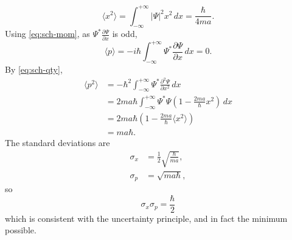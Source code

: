 \documentclass{article}
\begin{document}
\begin{enumerate}[(a)]
\begin{equation*}
    \langle x^2 \rangle
    = \int_{-\infty}^{+\infty} |\Psi|^2x^2 \,dx
    = \frac{\hbar}{4ma}.
  \end{equation*} Using \eqref{eq:sch-mom}, as $\Psi^*
  \frac{\partial\Psi}{\partial x}$ is odd, \begin{equation*}
    \langle p \rangle
    = -i\hbar\int_{-\infty}^{+\infty}
      \Psi^*\frac{\partial\Psi}{\partial x}
    \,dx
    = 0.
  \end{equation*} By \eqref{eq:sch-qty}, \begin{align*}
    \langle p^2 \rangle
    &= -\hbar^2\int_{-\infty}^{+\infty}
      \Psi^*\frac{\partial^2\Psi}{\partial x^2}
    \,dx \\
    &= 2ma\hbar\int_{-\infty}^{+\infty}
    \Psi^*\Psi\left(1 - \frac{2ma}{\hbar}x^2\right)
    \,dx \\
    &= 2ma\hbar\left(1 - \frac{2ma}{\hbar}\langle x^2 \rangle\right) \\
    &= ma\hbar.
  \end{align*} The standard deviations are \begin{align*}
    \sigma_x &= \frac{1}{2}\sqrt{\frac{\hbar}{ma}}, \\
    \sigma_p &= \sqrt{ma\hbar},
  \end{align*} so \begin{equation*}
    \sigma_x\sigma_p = \frac{\hbar}{2}
  \end{equation*} which is consistent with the uncertainty principle, and in
  fact the minimum possible.
\end{enumerate}
\end{document}
